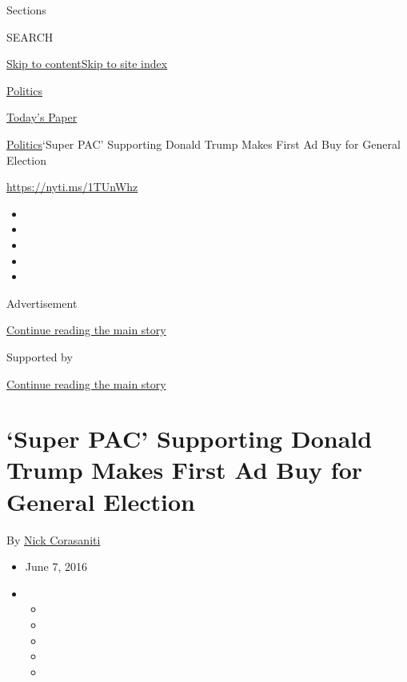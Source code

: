 Sections

SEARCH

\protect\hyperlink{site-content}{Skip to
content}\protect\hyperlink{site-index}{Skip to site index}

\href{https://www.nytimes.com/section/politics}{Politics}

\href{https://myaccount.nytimes.com/auth/login?response_type=cookie\&client_id=vi}{}

\href{https://www.nytimes.com/section/todayspaper}{Today's Paper}

\href{/section/politics}{Politics}\textbar{}`Super PAC' Supporting
Donald Trump Makes First Ad Buy for General Election

\url{https://nyti.ms/1TUnWhz}

\begin{itemize}
\item
\item
\item
\item
\item
\end{itemize}

Advertisement

\protect\hyperlink{after-top}{Continue reading the main story}

Supported by

\protect\hyperlink{after-sponsor}{Continue reading the main story}

\hypertarget{super-pac-supporting-donald-trump-makes-first-ad-buy-for-general-election}{%
\section{`Super PAC' Supporting Donald Trump Makes First Ad Buy for
General
Election}\label{super-pac-supporting-donald-trump-makes-first-ad-buy-for-general-election}}

By \href{http://www.nytimes.com/by/nick-corasaniti}{Nick Corasaniti}

\begin{itemize}
\item
  June 7, 2016
\item
  \begin{itemize}
  \item
  \item
  \item
  \item
  \item
  \end{itemize}
\end{itemize}

